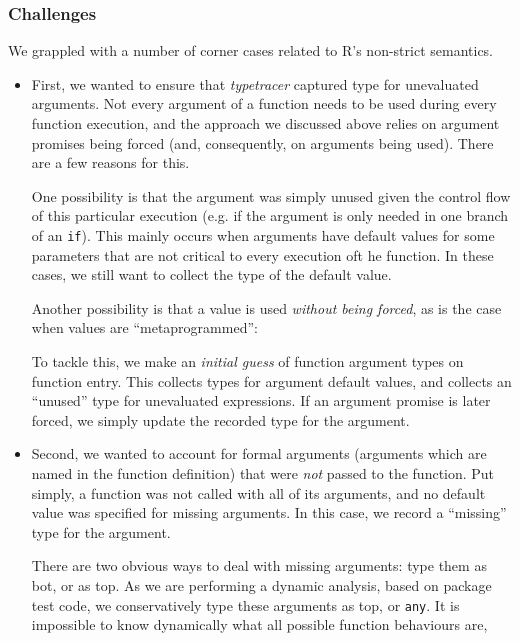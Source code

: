 \documentclass[acmsmall,review,anonymous]{acmart}\settopmatter{printfolios=true,printccs=false,printacmref=false}
\newcommand{\code}[1]{{\lstinline[style=Rin]!#1!}\xspace}
\newcommand{\typetracer}{\emph{typetracer}\xspace} %
\begin{document}
%
%
\subsubsection{Challenges}
\label{subsec:typetracer-challenges}

We grappled with a number of corner cases related to R's non-strict semantics.

\begin{itemize}

\item First, we wanted to ensure that \typetracer captured type for unevaluated arguments. 
Not every argument of a function needs to be used during every function execution, and the approach we discussed above relies on argument promises being forced (and, consequently, on arguments being used).
There are a few reasons for this.

One possibility is that the argument was simply unused given the control flow of this particular execution (e.g. if the argument is only needed in one branch of an \code{if}).
This mainly occurs when arguments have default values for some parameters that are not critical to every execution oft he function.
In these cases, we still want to collect the type of the default value.

Another possibility is that a value is used {\it without being forced}, as is the case when values are ``metaprogrammed'': 

To tackle this, we make an {\it initial guess} of function argument types on function entry.
This collects types for argument default values, and collects an ``unused'' type for unevaluated expressions.
If an argument promise is later forced, we simply update the recorded type for the argument.

\item Second, we wanted to account for formal arguments (arguments which are named in the function definition) that were {\it not} passed to the function.
Put simply, a function was not called with all of its arguments, and no default value was specified for missing arguments.
In this case, we record a ``missing'' type for the argument.

There are two obvious ways to deal with missing arguments: type them as bot, or as top.
As we are performing a dynamic analysis, based on package test code, we conservatively type these arguments as top, or \code{any}.
It is impossible to know dynamically what all possible function behaviours are, 


\end{itemize}
\end{document}
